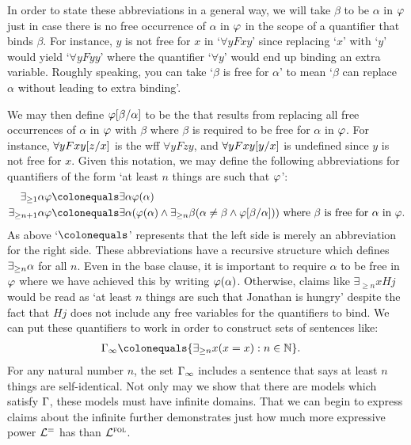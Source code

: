 In order to state these abbreviations in a general way, we will take $\beta$ to be  $\alpha$ in $\varphi$ just in case there is no free occurrence of $\alpha$ in $\varphi$ in the scope of a quantifier that binds $\beta$. 
For instance, $y$ is not free for $x$ in `$\forall y Fxy$' since replacing `$x$' with `$y$' would yield `$\forall yFyy$' where the quantifier `$\forall y$' would end up binding an extra variable.
Roughly speaking, you can take `$\beta$ is free for $\alpha$' to mean `$\beta$ can replace $\alpha$ without leading to extra binding'.

We may then define $\varphi[\beta/\alpha]$ to be the  that results from replacing all free occurrences of $\alpha$ in $\varphi$ with $\beta$ where $\beta$ is required to be free for $\alpha$ in $\varphi$. 
For instance, $\forall yFxy[z/x]$ is the wff $\forall yFzy$, and $\forall yFxy[y/x]$ is undefined since $y$ is not free for $x$.
Given this notation, we may define the following abbreviations for quantifiers of the form `at least $n$ things are such that $\varphi$':
\begin{align*}
  \qt{\exists_{\geq 1}}{\alpha}\metaA &\colonequals \qt{\exists}{\alpha}\metaA(\alpha)\\ 
  \qt{\exists_{\geq n+1}}{\alpha}\metaA &\colonequals \qt{\exists}{\alpha}(\metaA(\alpha) \eand \qt{\exists_{\geq n}}{\beta}(\alpha \neq \beta \eand \metaA\unisub{\beta}{\alpha})) \text{ where } \beta \text{ is free for } \alpha \text{ in } \metaA.
\end{align*}
As above `$\colonequals$' represents that the left side is merely an abbreviation for the right side. 
These abbreviations have a recursive structure which defines $\exists_{\geq n} \alpha$ for all $n$.
Even in the base clause, it is important to require $\alpha$ to be free in $\varphi$ where we have achieved this by writing $\varphi(\alpha)$.
Otherwise, claims like $\exists_{\geq n} x Hj$ would be read as `at least $n$ things are such that Jonathan is hungry' despite the fact that $Hj$ does not include any free variables for the quantifiers to bind. 
We can put these quantifiers to work in order to construct sets of sentences like:
\begin{align*}
  \MetaG_{\infty} &\colonequals \set{\qt{\exists_{\geq n}}{x}(x=x): n\in\mathbb{N}}.
\end{align*}
For any natural number $n$, the set $\Gamma_\infty$ includes a sentence that says at least $n$ things are self-identical.
Not only may we show that there are models which satisfy $\Gamma$, these models must have infinite domains.
That we can begin to express claims about the infinite further demonstrates just how much more expressive power $\mathcal{L}^{=}$ has than $\mathcal{L}^{\textsc{fol}}$. 

